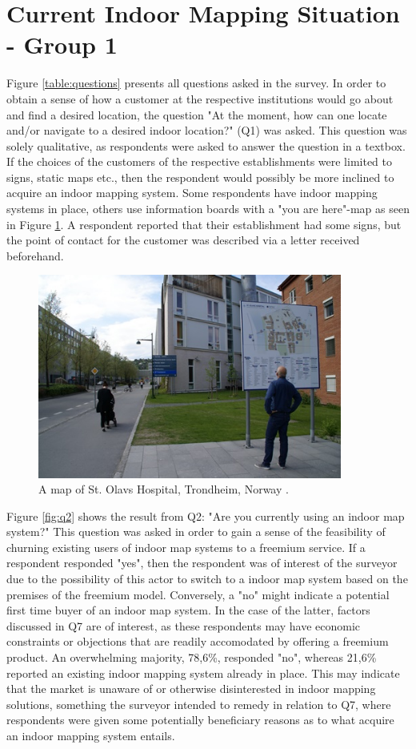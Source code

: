 \section{Current Indoor Mapping Situation - Group 1}
Figure \ref{table:questions} presents all questions asked in the survey. In order to obtain a sense of how a customer at the respective institutions would go about and find a desired location, the question "At the moment, how can one locate and/or navigate to a desired indoor location?" (Q1) was asked. This question was solely qualitative, as respondents were asked to answer the question in a textbox. If the choices of the customers of the respective establishments were limited to signs, static maps etc., then the respondent would possibly be more inclined to acquire an indoor mapping system. Some respondents have indoor mapping systems in place, others use information boards with a "you are here"-map as seen in Figure \ref{fig:stolavs}. A respondent reported that their establishment had some signs, but the point of contact for the customer was described via a letter received beforehand. 
\begin{figure}[H]
\centering
\includegraphics[width=10cm]{figs/findway.jpg}
\caption{A map of St. Olavs Hospital, Trondheim, Norway \cite{stolavs}.}
\label{fig:stolavs}
\end{figure}

Figure \ref{fig:q2} shows the result from Q2: "Are you currently using an indoor map system?" This question was asked in order to gain a sense of the feasibility of churning existing users of indoor map systems to a freemium service. If a respondent responded "yes", then the respondent was of interest of the surveyor due to the possibility of this actor to switch to a indoor map system based on the premises of the freemium model. Conversely, a "no" might indicate a potential first time buyer of an indoor map system. In the case of the latter, factors discussed in Q7 are of interest, as these respondents may have economic constraints or objections that are readily accomodated by offering a freemium product. An overwhelming majority, 78,6\%, responded "no", whereas 21,6\% reported an existing indoor mapping system already in place. This may indicate that the market is unaware of or otherwise disinterested in indoor mapping solutions, something the surveyor intended to remedy in relation to Q7, where respondents were given some potentially beneficiary reasons as to what acquire an indoor mapping system entails.

